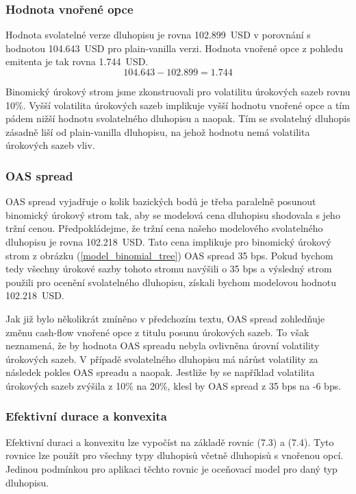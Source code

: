 \documentclass[a4paper]{book}
\begin{document}
\subsubsection{Hodnota vnořené opce}

Hodnota svolatelné verze dluhopisu je rovna 102.899~USD v porovnání s hodnotou 104.643~USD pro plain-vanilla verzi. Hodnota vnořené opce z pohledu emitenta je tak rovna 1.744~USD.
\begin{equation*}
104.643 - 102.899 = 1.744
\end{equation*}

Binomický úrokový strom jsme zkonstruovali pro volatilitu úrokových sazeb rovnu 10\%. Vyšší volatilita úrokových sazeb implikuje vyšší hodnotu vnořené opce a tím pádem nižší hodnotu svolatelného dluhopisu a naopak. Tím se svolatelný dluhopis zásadně liší od plain-vanilla dluhopisu, na jehož hodnotu nemá volatilita úrokových sazeb vliv.

\subsubsection{OAS spread}

OAS spread vyjadřuje o kolik bazických bodů je třeba paralelně posunout binomický úrokový strom tak, aby se modelová cena dluhopisu shodovala s jeho tržní cenou. Předpokládejme, že tržní cena našeho modelového svolatelného dluhopisu je rovna 102.218~USD. Tato cena implikuje pro binomický úrokový strom z obrázku (\ref{model_binomial_tree}) OAS spread 35 bps. Pokud bychom tedy všechny úrokové sazby tohoto stromu navýšili o 35 bps a výsledný strom použili pro ocenění svolatelného dluhopisu, získali bychom modelovou hodnotu 102.218~USD.

Jak již bylo několikrát zmíněno v předchozím textu, OAS spread zohledňuje změnu cash-flow vnořené opce z titulu posunu úrokových sazeb. To však neznamená, že by hodnota OAS spreadu nebyla ovlivněna úrovní volatility úrokových sazeb. V případě svolatelného dluhopisu má nárůst volatility za následek pokles OAS spreadu a naopak. Jestliže by se například volatilita úrokových sazeb zvýšila z 10\% na 20\%, klesl by OAS spread z 35 bps na -6 bps.

\subsubsection{Efektivní durace a konvexita}

Efektivní duraci a konvexitu lze vypočíst na základě rovnic (7.3) a (7.4). Tyto rovnice lze použít pro všechny typy dluhopisů včetně dluhopisů s vnořenou opcí. Jedinou podmínkou pro aplikaci těchto rovnic je oceňovací model pro daný typ dluhopisu.
\end{document}
